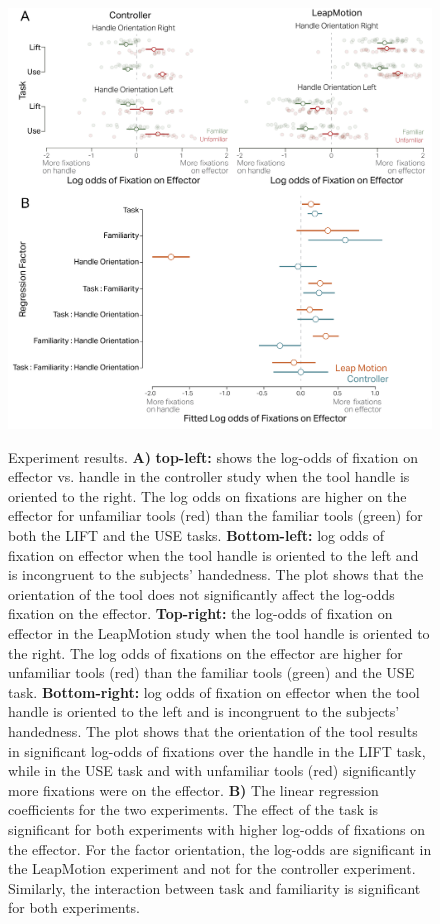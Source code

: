 \begin{figure}[h]
    \centering
    \includegraphics[width=0.9\linewidth]{source/figures/result/results_combined_logodds_fullmodel.png} \\
    \caption[]{Experiment results. \textbf{A)} \textbf{top-left:} shows the log-odds of fixation on effector vs. handle in the controller study when the tool handle is oriented to the right. The log odds on fixations are higher on the effector for unfamiliar tools (red) than the familiar tools (green) for both the LIFT and the USE tasks. \textbf{Bottom-left:} log odds of fixation on effector when the tool handle is oriented to the left and is incongruent to the subjects’ handedness. The plot shows that the orientation of the tool does not significantly affect the log-odds fixation on the effector. \textbf{Top-right:} the log-odds of fixation on effector in the LeapMotion study when the tool handle is oriented to the right. The log odds of fixations on the effector are higher for unfamiliar tools (red) than the familiar tools (green) and the USE task. \textbf{Bottom-right:} log odds of fixation on effector when the tool handle is oriented to the left and is incongruent to the subjects’ handedness. The plot shows that the orientation of the tool results in significant log-odds of fixations over the handle in the LIFT task, while in the USE task and with unfamiliar tools (red) significantly more fixations were on the effector. \textbf{B)} The linear regression coefficients for the two experiments. The effect of the task is significant for both experiments with higher log-odds of fixations on the effector. For the factor orientation, the log-odds are significant in the LeapMotion experiment and not for the controller experiment. Similarly, the interaction between task and familiarity is significant for both experiments.
}
    \label{figure:log_odds}
\end{figure}


